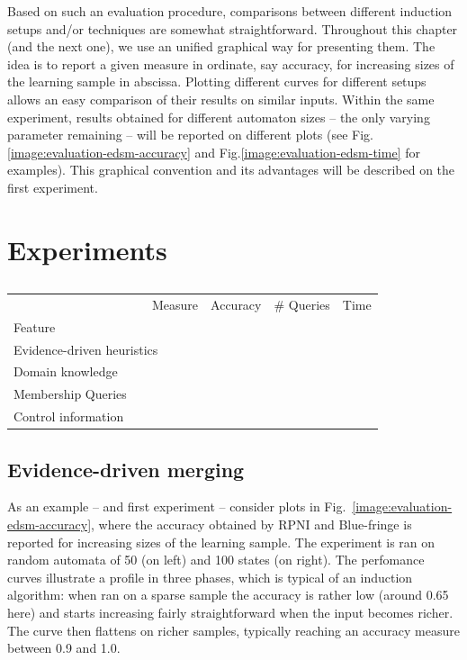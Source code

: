 Based on such an evaluation procedure, comparisons between different induction setups and/or techniques are somewhat straightforward. Throughout this chapter (and the next one), we use an unified graphical way for presenting them. The idea is to report a given measure in ordinate, say accuracy, for increasing sizes of the learning sample in abscissa. Plotting different curves for different setups allows an easy comparison of their results on similar inputs. Within the same experiment, results obtained for different automaton sizes -- the only varying parameter remaining -- will be reported on different plots (see Fig.\ref{image:evaluation-edsm-accuracy} and Fig.\ref{image:evaluation-edsm-time} for examples). This graphical convention and its advantages will be described on the first experiment.

\section{Experiments\label{section:evaluation-experiments}}

\begin{table}[h]
\renewcommand{\arraystretch}{1.3}
\begin{center}
\begin{tabular}{| l || c | c | c |}
\hline
~~~~~~~~~~~~~~~~~~~~~~Measure & Accuracy &   \# Queries          &      Time      \\
Feature                       &          &                       &                \\
\hline
\hline
Evidence-driven heuristics    &          &                       &                \\
Domain knowledge              &          &                       &                \\
Membership Queries            &          & \cellcolor[gray]{0.7} &                \\
Control information           &          &                       &                \\
\hline
\end{tabular}
\end{center}
\caption{}
\end{table}

\subsection{Evidence-driven merging}

As an example -- and first experiment -- consider plots in Fig.~\ref{image:evaluation-edsm-accuracy}, where the accuracy obtained by RPNI and Blue-fringe is reported for increasing sizes of the learning sample. The experiment is ran on random automata of 50 (on left) and 100 states (on right). The perfomance curves illustrate a profile in three phases, which is typical of an induction algorithm: when ran on a sparse sample the accuracy is rather low (around 0.65 here) and starts increasing fairly straightforward when the input becomes richer. The curve then flattens on richer samples, typically reaching an accuracy measure between 0.9 and 1.0. 

